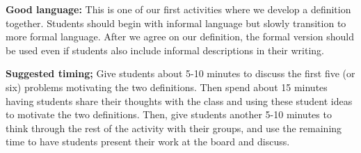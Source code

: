 \documentclass[nooutcomes,noauthor]{ximera}
\begin{document}
\begin{instructorNotes}
{\bf Good language:} This is one of our first activities where we develop a definition together. Students should begin with informal language but slowly transition to more formal language. After we agree on our definition, the formal version should be used even if students also include informal descriptions in their writing.


{\bf Suggested timing;} Give students about 5-10 minutes to discuss the first five (or six) problems motivating the two definitions. Then spend about 15 minutes having students share their thoughts with the class and using these student ideas to motivate the two definitions. Then, give students another 5-10 minutes to think through the rest of the activity with their groups, and use the remaining time to have students present their work at the board and discuss.

\end{instructorNotes}
\end{document}
